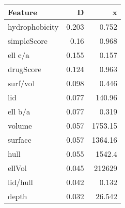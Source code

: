 \begin{tabular}{lrr}
\hline
 Feature        &     D &          x \\
\hline
 hydrophobicity & 0.203 &      0.752 \\
 simpleScore    & 0.16  &      0.968 \\
 ell c/a        & 0.155 &      0.157 \\
 drugScore      & 0.124 &      0.963 \\
 surf/vol       & 0.098 &      0.446 \\
 lid            & 0.077 &    140.96  \\
 ell b/a        & 0.077 &      0.319 \\
 volume         & 0.057 &   1753.15  \\
 surface        & 0.057 &   1364.16  \\
 hull           & 0.055 &   1542.4   \\
 ellVol         & 0.045 & 212629     \\
 lid/hull       & 0.042 &      0.132 \\
 depth          & 0.032 &     26.542 \\
\hline
\end{tabular}